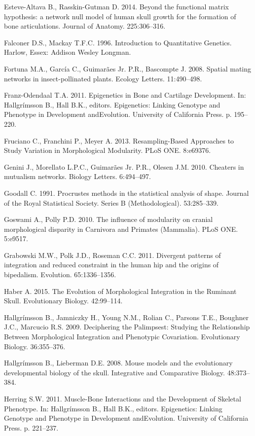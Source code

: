 \documentclass[12pt,]{article}
\begin{document}
Esteve-Altava B., Rasskin-Gutman D. 2014. Beyond the functional matrix
hypothesis: a network null model of human skull growth for the formation
of bone articulations. Journal of Anatomy. 225:306--316.

Falconer D.S., Mackay T.F.C. 1996. Introduction to Quantitative
Genetics. Harlow, Essex: Addison Wesley Longman.

Fortuna M.A., García C., Guimarães Jr. P.R., Bascompte J. 2008. Spatial
mating networks in insect-pollinated plants. Ecology Letters.
11:490--498.

Franz-Odendaal T.A. 2011. Epigenetics in Bone and Cartilage Development.
In: Hallgrímsson B., Hall B.K., editors. Epigenetics: Linking Genotype
and Phenotype in Development andEvolution. University of California
Press. p. 195--220.

Fruciano C., Franchini P., Meyer A. 2013. Resampling-Based Approaches to
Study Variation in Morphological Modularity. PLoS ONE. 8:e69376.

Genini J., Morellato L.P.C., Guimarães Jr. P.R., Olesen J.M. 2010.
Cheaters in mutualism networks. Biology Letters. 6:494--497.

Goodall C. 1991. Procrustes methods in the statistical analysis of
shape. Journal of the Royal Statistical Society. Series B
(Methodological). 53:285--339.

Goswami A., Polly P.D. 2010. The influence of modularity on cranial
morphological disparity in Carnivora and Primates (Mammalia). PLoS ONE.
5:e9517.

Grabowski M.W., Polk J.D., Roseman C.C. 2011. Divergent patterns of
integration and reduced constraint in the human hip and the origins of
bipedalism. Evolution. 65:1336--1356.

Haber A. 2015. The Evolution of Morphological Integration in the
Ruminant Skull. Evolutionary Biology. 42:99--114.

Hallgrímsson B., Jamniczky H., Young N.M., Rolian C., Parsons T.E.,
Boughner J.C., Marcucio R.S. 2009. Deciphering the Palimpsest: Studying
the Relationship Between Morphological Integration and Phenotypic
Covariation. Evolutionary Biology. 36:355--376.

Hallgrímsson B., Lieberman D.E. 2008. Mouse models and the evolutionary
developmental biology of the skull. Integrative and Comparative Biology.
48:373--384.

Herring S.W. 2011. Muscle-Bone Interactions and the Development of
Skeletal Phenotype. In: Hallgrímsson B., Hall B.K., editors.
Epigenetics: Linking Genotype and Phenotype in Development andEvolution.
University of California Press. p. 221--237.
\end{document}
